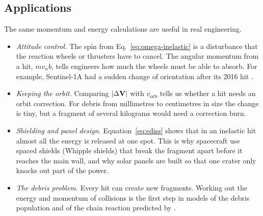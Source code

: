 \subsection{Applications}
\label{sec:applications}

The same momentum and energy calculations are useful in real engineering.
\begin{itemize}
  \item \textit{Attitude control.} The spin from
    Eq.~\eqref{eq:omega-inelastic} is a disturbance that the reaction
    wheels or thrusters have to cancel. The angular momentum from a hit,
    $m v_n b$, tells engineers how much the wheels must be able to absorb.
    For example, Sentinel-1A had a sudden change of orientation after its
    2016 hit \citep{krag2017}.
  \item \textit{Keeping the orbit.} Comparing $|\Delta\mathbf{V}|$ with
    $v_{\mathrm{orb}}$ tells us whether a hit needs an orbit correction.
    For debris from millimetres to centimetres in size the change is tiny,
    but a fragment of several kilograms would need a correction burn.
  \item \textit{Shielding and panel design.} Equation~\eqref{eq:ediss}
    shows that in an inelastic hit almost all the energy is released at
    one spot. This is why spacecraft use spaced shields (Whipple shields)
    that break the fragment apart before it reaches the main wall, and why
    solar panels are built so that one crater only knocks out part of the
    power.
  \item \textit{The debris problem.} Every hit can create new fragments.
    Working out the energy and momentum of collisions is the first step in
    models of the debris population and of the chain reaction predicted by
    \citet{kessler1978}.
\end{itemize}
